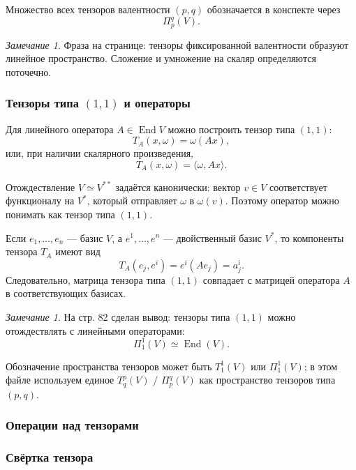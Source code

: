 \documentclass[12pt,a4paper]{article}
\theoremstyle{definition}
\theoremstyle{plain}
\theoremstyle{remark}
\newtheorem{remark}[definition]{Замечание}
\newenvironment{knowledgefix}{\begin{clarifybox}}{\end{clarifybox}}
\newcommand{\End}{\operatorname{End}}
\newcommand{\Tens}[2]{\Pi^{#2}_{#1}(V)}
\begin{document}
Множество всех тензоров валентности $(p,q)$ обозначается в конспекте через
\[
    \Tens{p}{q}.
\]

\begin{remark}
Фраза на странице: тензоры фиксированной валентности образуют линейное пространство. Сложение и умножение на скаляр определяются поточечно.
\end{remark}

\subsubsection*{Тензоры типа $(1,1)$ и операторы}

Для линейного оператора $A\in \End V$ можно построить тензор типа $(1,1)$:
\[
    T_A(x,\omega)=\omega(Ax),
\]
или, при наличии скалярного произведения,
\[
    T_A(x,\omega)=\langle \omega,Ax\rangle.
\]
\begin{knowledgefix}
Отождествление \(V\simeq V^{**}\) задаётся канонически: вектор \(v\in V\) соответствует функционалу на \(V^*\), который отправляет \(\omega\) в \(\omega(v)\). Поэтому оператор можно понимать как тензор типа \((1,1)\).
\end{knowledgefix}

Если $e_1,\ldots,e_n$ --- базис $V$, а $e^1,\ldots,e^n$ --- двойственный базис $V^*$, то компоненты тензора $T_A$ имеют вид
\[
    T_A(e_j,e^i)=e^i(Ae_j)=a^i_j.
\]
Следовательно, матрица тензора типа $(1,1)$ совпадает с матрицей оператора $A$ в соответствующих базисах.

\begin{remark}
На стр. 82 сделан вывод: тензоры типа $(1,1)$ можно отождествлять с линейными операторами:
\[
    \Tens{1}{1}\simeq \End(V).
\]
\begin{knowledgefix}
Обозначение пространства тензоров может быть \(T^1_1(V)\) или \(\Pi^1_1(V)\); в этом файле используем единое \(T^p_q(V)\) / \(\Tens{p}{q}\) как пространство тензоров типа \((p,q)\).
\end{knowledgefix}
\end{remark}

\subsubsection{Операции над тензорами}

\subsubsection*{Свёртка тензора}
\end{document}
